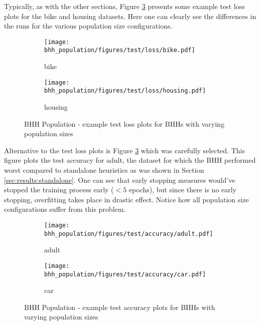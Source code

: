 Typically, as with the other sections, Figure \ref{fig:results:population:figures:loss} presents some example test loss plots for the bike and housing datasets. Here one can clearly see the differences in the runs for the various population size configurations.


\begin{figure}[htbp]
      \begin{subfigure}{0.5\textwidth}
            \centering
            \texttt{[image: bhh\_population/figures/test/loss/bike.pdf]}
            \caption{bike}
            \label{fig:results:population:figures:loss1}
      \end{subfigure}
      \begin{subfigure}{0.5\textwidth}
            \centering
            \texttt{[image: bhh\_population/figures/test/loss/housing.pdf]}
            \caption{housing}
            \label{fig:results:population:figures:loss2}
      \end{subfigure}
      \caption{\Acs{BHH} Population - example test loss plots for \Acsp{BHH} with varying population sizes}
      \label{fig:results:population:figures:loss}
\end{figure}

Alternative to the test loss plots is Figure \ref{fig:results:population:figures:loss} which was carefully selected. This figure plots the test accuracy for adult, the dataset for which the \Ac{BHH} performed worst compared to standalone heuristics as was shown in Section \ref{sec:results:standalone}. One can see that early stopping measures would've stopped the training process early ($< 5$ epochs), but since there is no early stopping, overfitting takes place in drastic effect. Notice how all population size configurations suffer from this problem.

\begin{figure}[htbp]
      \begin{subfigure}{0.5\textwidth}
            \centering
            \texttt{[image: bhh\_population/figures/test/accuracy/adult.pdf]}
            \caption{adult}
            \label{fig:results:population:figures:accuracy1}
      \end{subfigure}
      \begin{subfigure}{0.5\textwidth}
            \centering
            \texttt{[image: bhh\_population/figures/test/accuracy/car.pdf]}
            \caption{car}
            \label{fig:results:population:figures:accuracy2}
      \end{subfigure}
      \caption{\Acs{BHH} Population - example test accuracy plots for \Acsp{BHH} with varying population sizes}
      \label{fig:results:population:figures:accuracy}
\end{figure}

